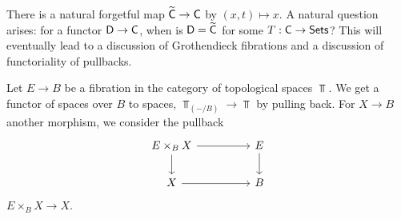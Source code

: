 There is a natural forgetful map $\widetilde{\mathsf{C}}\to\mathsf{C}$ by $(x,t)\mapsto x$. A natural question arises: for a functor $\mathsf{D}\to\mathsf{C}$, when is $\mathsf{D}=\widetilde{\mathsf{C}}$ for some $T:\mathsf{C}\to\mathsf{Sets}$? This will eventually lead to a discussion of Grothendieck fibrations and a discussion of functoriality of pullbacks. 
\begin{example}
    Let $E\to B$ be a fibration in the category of topological spaces $\Top$. We get a functor of spaces over $B$ to spaces, $\Top_{(-/B)}\to\Top$ by pulling back. For $X\to B$ another morphism, we consider the pullback 
    $$%
    \begin{tikzcd}
        {E\times_{B}X} && E \\
        X && B
        \arrow[from=1-1, to=1-3]
        \arrow[from=1-3, to=2-3]
        \arrow[from=2-1, to=2-3]
        \arrow[from=1-1, to=2-1]
    \end{tikzcd}$$
    $E\times_{B}X\to X$. 
\end{example}